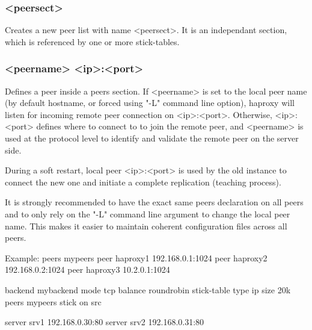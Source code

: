 \subsubsection[peers]{ <peersect>}

Creates a new peer list with name <peersect>. It is an independant section,
which is referenced by one or more stick-tables.

\subsubsection[peer]{ <peername> <ip>:<port>}

Defines a peer inside a peers section.
If <peername> is set to the local peer name (by default hostname, or forced
using "-L" command line option), haproxy will listen for incoming remote peer
connection on <ip>:<port>. Otherwise, <ip>:<port> defines where to connect to
to join the remote peer, and <peername> is used at the protocol level to
identify and validate the remote peer on the server side.

During a soft restart, local peer <ip>:<port> is used by the old instance to
connect the new one and initiate a complete replication (teaching process).

It is strongly recommended to have the exact same peers declaration on all
peers and to only rely on the "-L" command line argument to change the local
peer name. This makes it easier to maintain coherent configuration files
across all peers.

\begin{example}{Example:}
    peers mypeers
        peer haproxy1 192.168.0.1:1024
        peer haproxy2 192.168.0.2:1024
        peer haproxy3 10.2.0.1:1024

    backend mybackend
        mode tcp
        balance roundrobin
        stick-table type ip size 20k peers mypeers
        stick on src

        server srv1 192.168.0.30:80
        server srv2 192.168.0.31:80
\end{example}
